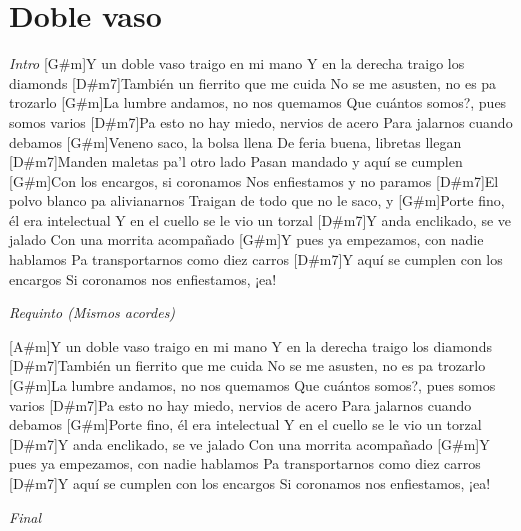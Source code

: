 \section{Doble vaso}

\noindent
\vspace{1cm}

\begin{guitar}
	\begin{multicols}{2}

		\textit{Intro}
		[G#m]Y un doble vaso traigo en mi mano
		Y en la derecha traigo los diamonds
		[D#m7]Tambi\'en un fierrito que me cuida
		No se me asusten, no es pa trozarlo
		[G#m]La lumbre andamos, no nos quemamos
		Que cu\'antos somos?, pues somos varios
		[D#m7]Pa esto no hay miedo, nervios de acero
		Para jalarnos cuando debamos
		[G#m]Veneno saco, la bolsa llena
		De feria buena, libretas llegan
		[D#m7]Manden maletas pa'l otro lado
		Pasan mandado y aqu\'i se cumplen
		[G#m]Con los encargos, si coronamos
		Nos enfiestamos y no paramos
		[D#m7]El polvo blanco pa alivianarnos
		Traigan de todo que no le saco, y
		[G#m]Porte fino, \'el era intelectual
		Y en el cuello se le vio un torzal
		[D#m7]Y anda enclikado, se ve jalado
		Con una morrita acompa\~{n}ado
		[G#m]Y pues ya empezamos, con nadie hablamos
		Pa transportarnos como diez carros
		[D#m7]Y aqu\'i se cumplen con los encargos
		Si coronamos nos enfiestamos, ¡ea!

		\textit{Requinto (Mismos acordes)}

		[A#m]Y un doble vaso traigo en mi mano
		Y en la derecha traigo los diamonds
		[D#m7]Tambi\'en un fierrito que me cuida
		No se me asusten, no es pa trozarlo
		[G#m]La lumbre andamos, no nos quemamos
		Que cu\'antos somos?, pues somos varios
		[D#m7]Pa esto no hay miedo, nervios de acero
		Para jalarnos cuando debamos
		[G#m]Porte fino, \'el era intelectual
		Y en el cuello se le vio un torzal
		[D#m7]Y anda enclikado, se ve jalado
		Con una morrita acompa\~{n}ado
		[G#m]Y pues ya empezamos, con nadie hablamos
		Pa transportarnos como diez carros
		[D#m7]Y aqu\'i se cumplen con los encargos
		Si coronamos nos enfiestamos, ¡ea!

		\textit{Final}

	\end{multicols}
\end{guitar}

